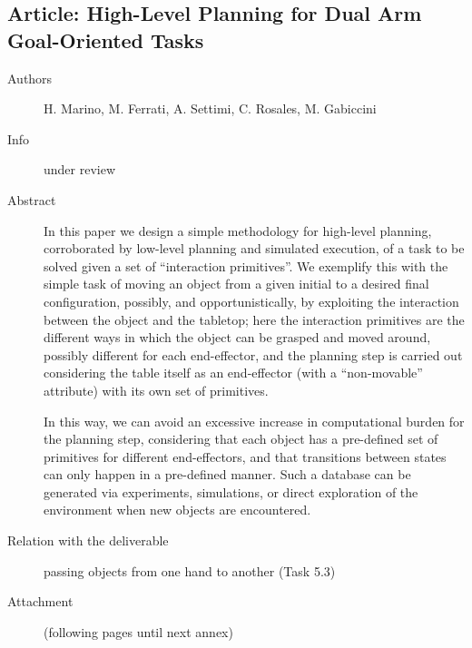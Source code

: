 \documentclass[a4paper,11pt,pdf]{pacmanreport}
\begin{document}
%

\subsection{Article: High-Level Planning for Dual Arm Goal-Oriented Tasks} \label{ann:dualArmPlanning}
\begin{description}
    \item[Authors] H. Marino, M. Ferrati, A. Settimi, C. Rosales, M. Gabiccini
    \item[Info] under review
    \item[Abstract] 
    In this paper we design a simple methodology for high-level planning, corroborated by low-level planning and simulated execution, of a task to be solved given a set of ``interaction primitives''. We exemplify this with the simple task of moving an object from a given initial to a desired final configuration, possibly, and opportunistically, by exploiting the interaction between the object and the tabletop; here the interaction primitives are the different ways in which the object can be grasped and moved around, possibly different for each end-effector, and the planning step is carried out considering the table itself as an end-effector (with a ``non-movable'' attribute) with its own set of primitives.
    
In this way, we can avoid an excessive increase in computational burden for the planning step, considering that each object has a pre-defined set of primitives for different end-effectors, and that transitions between states can only happen in a pre-defined manner. Such a database can be generated via experiments, simulations, or direct exploration of the environment when new objects are encountered.
    \item[Relation with the deliverable] passing objects from one hand to another (Task 5.3)
    \item[Attachment] (following pages until next annex)
\end{description}
%
\end{document}
